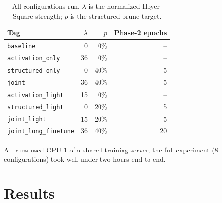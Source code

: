 \documentclass[11pt]{article}
\newcommand{\code}[1]{\texttt{#1}}
\begin{document}
\begin{table}[H]
\centering
\caption{All configurations run. $\lambda$ is the normalized Hoyer-Square strength; $p$ is the structured prune target.}
\label{tab:configs}
\begin{tabular}{@{}lrrr@{}}
\toprule
Tag & $\lambda$ & $p$ & Phase-2 epochs \\
\midrule
\code{baseline} & 0 & 0\% & -- \\
\code{activation\_only} & 36 & 0\% & -- \\
\code{structured\_only} & 0 & 40\% & 5 \\
\code{joint} & 36 & 40\% & 5 \\
\code{activation\_light} & 15 & 0\% & -- \\
\code{structured\_light} & 0 & 20\% & 5 \\
\code{joint\_light} & 15 & 20\% & 5 \\
\code{joint\_long\_finetune} & 36 & 40\% & 20 \\
\bottomrule
\end{tabular}
\end{table}

All runs used GPU 1 of a shared training server; the full experiment (8 configurations) took well under two hours end to end.

\section{Results}
\label{sec:results}
\end{document}
